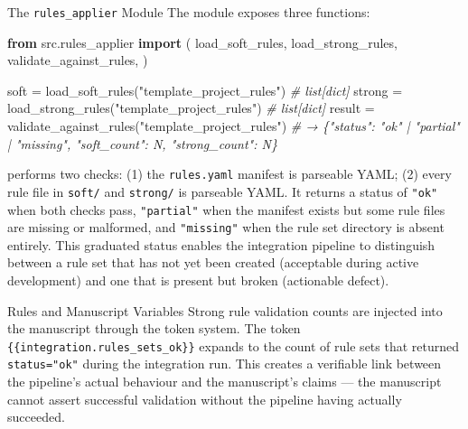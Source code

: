 \documentclass[
  ignorenonframetext,
]{beamer}
\newenvironment{Shaded}{}{}
\newcommand{\CommentTok}[1]{\textcolor[rgb]{0.38,0.63,0.69}{\textit{#1}}}
\newcommand{\ImportTok}[1]{\textcolor[rgb]{0.00,0.50,0.00}{\textbf{#1}}}
\newcommand{\NormalTok}[1]{#1}
\newcommand{\OperatorTok}[1]{\textcolor[rgb]{0.40,0.40,0.40}{#1}}
\newcommand{\StringTok}[1]{\textcolor[rgb]{0.25,0.44,0.63}{#1}}
\begin{document}
\begin{frame}{The \texttt{rules\_applier}
Module}
\protect{}\label{the-rules_applier-module}
The  module exposes three functions:

\begin{Shaded}
\begin{Highlighting}[]
\ImportTok{from}\NormalTok{ src.rules\_applier }\ImportTok{import}\NormalTok{ (}
\NormalTok{    load\_soft\_rules,}
\NormalTok{    load\_strong\_rules,}
\NormalTok{    validate\_against\_rules,}
\NormalTok{)}

\NormalTok{soft   }\OperatorTok{=}\NormalTok{ load\_soft\_rules(}\StringTok{"template\_project\_rules"}\NormalTok{)    }\CommentTok{\# list[dict]}
\NormalTok{strong }\OperatorTok{=}\NormalTok{ load\_strong\_rules(}\StringTok{"template\_project\_rules"}\NormalTok{)  }\CommentTok{\# list[dict]}
\NormalTok{result }\OperatorTok{=}\NormalTok{ validate\_against\_rules(}\StringTok{"template\_project\_rules"}\NormalTok{)}
\CommentTok{\# → \{"status": "ok" | "partial" | "missing", "soft\_count": N, "strong\_count": N\}}
\end{Highlighting}
\end{Shaded}

 performs two checks: (1) the
\texttt{rules.yaml} manifest is parseable YAML; (2) every rule file in
\texttt{soft/} and \texttt{strong/} is parseable YAML. It returns a
status of \texttt{"ok"} when both checks pass, \texttt{"partial"} when
the manifest exists but some rule files are missing or malformed, and
\texttt{"missing"} when the rule set directory is absent entirely. This
graduated status enables the integration pipeline to distinguish between
a rule set that has not yet been created (acceptable during active
development) and one that is present but broken (actionable defect).
\end{frame}

\begin{frame}{Rules and Manuscript Variables}
\protect{}\label{rules-and-manuscript-variables}
Strong rule validation counts are injected into the manuscript through
the token system. The token \texttt{\{\{integration.rules\_sets\_ok\}\}}
expands to the count of rule sets that returned \texttt{status="ok"}
during the integration run. This creates a verifiable link between the
pipeline's actual behaviour and the manuscript's claims --- the
manuscript cannot assert successful validation without the pipeline
having actually succeeded.
\end{frame}
\end{document}
